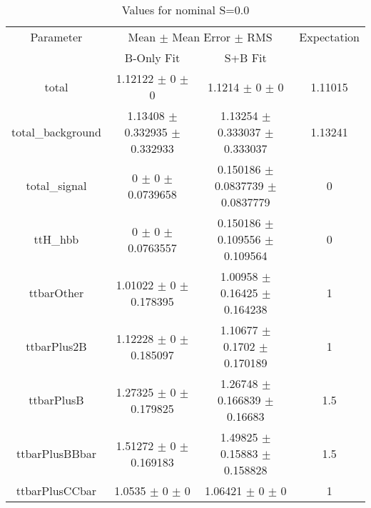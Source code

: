 \begin{table}
\centering
\caption{Values for nominal S=0.0}
\begin{tabular}{cccc}
\toprule
Parameter & \multicolumn{2}{c}{Mean $\pm$ Mean Error $\pm$ RMS} & Expectation\\
 & B-Only Fit & S+B Fit & \\
\midrule
total & \num{1.12122} $\pm$ \num{0} $\pm$ \num{0} & \num{1.1214} $\pm$ \num{0} $\pm$ \num{0} & \num{1.11015}\\
total\_background & \num{1.13408} $\pm$ \num{0.332935} $\pm$ \num{0.332933} & \num{1.13254} $\pm$ \num{0.333037} $\pm$ \num{0.333037} & \num{1.13241}\\
total\_signal & \num{0} $\pm$ \num{0} $\pm$ \num{0.0739658} & \num{0.150186} $\pm$ \num{0.0837739} $\pm$ \num{0.0837779} & \num{0}\\
ttH\_hbb & \num{0} $\pm$ \num{0} $\pm$ \num{0.0763557} & \num{0.150186} $\pm$ \num{0.109556} $\pm$ \num{0.109564} & \num{0}\\
ttbarOther & \num{1.01022} $\pm$ \num{0} $\pm$ \num{0.178395} & \num{1.00958} $\pm$ \num{0.16425} $\pm$ \num{0.164238} & \num{1}\\
ttbarPlus2B & \num{1.12228} $\pm$ \num{0} $\pm$ \num{0.185097} & \num{1.10677} $\pm$ \num{0.1702} $\pm$ \num{0.170189} & \num{1}\\
ttbarPlusB & \num{1.27325} $\pm$ \num{0} $\pm$ \num{0.179825} & \num{1.26748} $\pm$ \num{0.166839} $\pm$ \num{0.16683} & \num{1.5}\\
ttbarPlusBBbar & \num{1.51272} $\pm$ \num{0} $\pm$ \num{0.169183} & \num{1.49825} $\pm$ \num{0.15883} $\pm$ \num{0.158828} & \num{1.5}\\
ttbarPlusCCbar & \num{1.0535} $\pm$ \num{0} $\pm$ \num{0} & \num{1.06421} $\pm$ \num{0} $\pm$ \num{0} & \num{1}\\
\bottomrule
\end{tabular}
\end{table}
